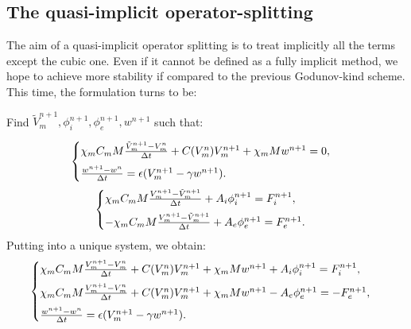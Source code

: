 \documentclass[a4paper,11pt]{article}
\begin{document}
\subsection{The quasi-implicit operator-splitting}
The aim of a quasi-implicit operator splitting is to treat implicitly all the terms except the cubic one. Even if it cannot be defined as a fully implicit method, we hope to achieve more stability if compared to the previous Godunov-kind scheme. This time, the formulation turns to be: \newline

\begin{center} Find $\tilde{V}_m^{n+1}, \phi_i^{n+1}, \phi_e^{n+1},w^{n+1}$ such that: \end{center}
\begin{equation*}
\begin{cases}
\chi_m C_m M \frac{\tilde{V}_m^{n+1}-V_m^n}{\Delta t} +  C(V_m^n) V_m^{n+1} + \chi_m M w^{n+1}= 0,\vspace{2mm}\\
\frac{w^{n+1} - w^n}{\Delta t} = \epsilon (V_m^{n+1}-\gamma w^{n+1}).
\end{cases}
\end{equation*}
\vspace{3mm}
\begin{equation*}
\begin{cases}
\chi_m C_m M \frac{V_m^{n+1}-\tilde{V}_m^{n+1}}{\Delta t} + A_i \phi_i^{n+1}= F_i^{n+1},\vspace{2mm}\\
- \chi_m C_m M \frac{V_m^{n+1}-\tilde{V}_m^{n+1}}{\Delta t} + A_e \phi_e^{n+1}= F_e^{n+1}.
\end{cases}
\end{equation*}
\vspace{3mm}
Putting into a unique system, we obtain:
\begin{equation}\label{Quasi}
\begin{cases}
\chi_m C_m M \frac{V_m^{n+1}-V_m^{n}}{\Delta t} + C(V_m^n) V_m^{n+1} + \chi_m M w^{n+1} + A_i \phi_i ^{n+1} = F_i^{n+1}, \vspace{2mm}\\
\chi_m C_m M \frac{V_m^{n+1}-V_m^{n}}{\Delta t} +  C(V_m^n) V_m^{n+1} + \chi_m M w^{n+1} - A_e \phi_e ^{n+1} =  -F_e^{n+1},\vspace{2mm} \\
\frac{w^{n+1}-w^{n}}{\Delta t} = \epsilon(V_m^{n+1}-\gamma w^{n+1}).
\end{cases}
\end{equation} 
\end{document}
